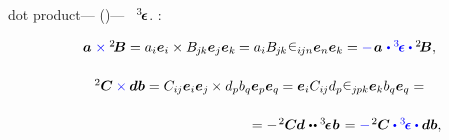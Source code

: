   dot product\:---   ()\:---  ~${^3\hspace{-0.25ex}\bm{\epsilon}}\hspace{.05ex}$.
  :

\nopagebreak\vspace{-0.1em}\begin{equation*}
\begin{array}{c}
\bm{a} \hspace{.1ex} \mathcolor{blue}{\times} {^2\hspace{-0.16em}\bm{B}} = a_i \bm{e}_i \times B_{\hspace{-0.1ex}j\hspace{-0.1ex}k} \bm{e}_j \bm{e}_k \hspace{-0.1ex} = \tikzmark{BeginVectorCrossTensor} a_i B_{\hspace{-0.1ex}j\hspace{-0.1ex}k} \hspace{.1ex} \levicivita_{i\hspace{-0.1ex}jn} \tikzmark{EndVectorCrossTensor} \bm{e}_n \bm{e}_k = \mathcolor{blue}{-} \hspace{.2ex} \bm{a} \hspace{.15ex} \mathcolor{blue}{\dotp \levicivitatensor \dotp} {^2\!\bm{B}} ,
\\[1.6em]
%
{^2\hspace{-0.05ex}\bm{C}} \mathcolor{blue}{\times} \hspace{-0.1ex} \bm{d} \bm{b} = C_{i\hspace{-0.1ex}j} \bm{e}_i \bm{e}_j \hspace{-0.1ex} \times d_p b_q \bm{e}_p \bm{e}_q \hspace{-0.1ex} = \bm{e}_i C_{i\hspace{-0.1ex}j} d_p \tikzmark{BeginTensorCrossTensor} \levicivita_{j\hspace{-0.1ex}pk} \tikzmark{EndTensorCrossTensor} \bm{e}_k b_q \bm{e}_q =
\\[1.6em]
\hspace{12.5em} =
- \hspace{.2ex} {^2\hspace{-0.05ex}\bm{C}} \hspace{-0.1ex} \bm{d} \hspace{.12ex} \dotdotp \levicivitatensor \hspace{.1ex} \bm{b} \hspace{.2ex} =
\mathcolor{blue}{-} \hspace{.2ex} {^2\hspace{-0.05ex}\bm{C}} \mathcolor{blue}{\dotp \levicivitatensor \dotp} \bm{d} \bm{b} ,
\\
\end{array}
\end{equation*}%
